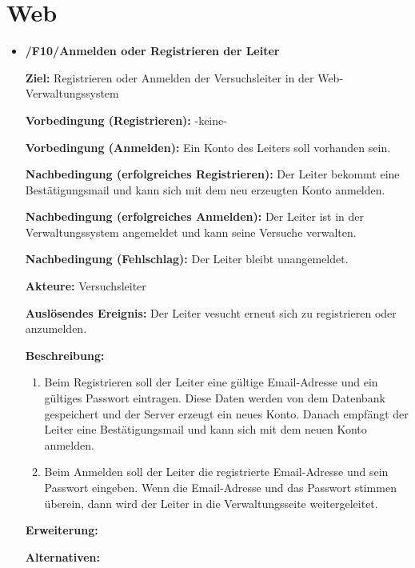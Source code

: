 \documentclass[a4paper]{scrreprt}
\begin{document}
		\section{Web}
	        \begin{itemize}
	            \item \textbf{/F10/Anmelden oder Registrieren der Leiter}
		          
	            	\par \textbf{Ziel: }Registrieren oder Anmelden der Versuchsleiter in der Web-Verwaltungssystem
	            	\par \textbf{Vorbedingung (Registrieren): }-keine-
	            	\par \textbf{Vorbedingung (Anmelden): }Ein Konto des Leiters soll vorhanden sein.
	            	\par \textbf{Nachbedingung (erfolgreiches Registrieren): }Der Leiter bekommt eine Bestätigungsmail und kann sich mit dem neu erzeugten Konto anmelden.
	            	\par \textbf{Nachbedingung (erfolgreiches Anmelden): }Der Leiter ist in der Verwaltungssystem angemeldet und kann seine Versuche verwalten.
	            	\par \textbf{Nachbedingung (Fehlschlag): }Der Leiter bleibt unangemeldet.
	            	\par \textbf{Akteure: }Versuchsleiter
	            	\par \textbf{Auslösendes Ereignis: }Der Leiter vesucht erneut sich zu registrieren oder anzumelden.
	            	\par \textbf{Beschreibung: }
		            	\begin{enumerate}
		            		\item Beim Registrieren soll der Leiter eine gültige Email-Adresse und ein gültiges Passwort eintragen. Diese Daten werden von dem Datenbank gespeichert und der Server erzeugt ein neues Konto. Danach empfängt der Leiter eine Bestätigungsmail und kann sich mit dem neuen Konto anmelden.
			            	\item Beim Anmelden soll der Leiter die registrierte Email-Adresse und sein Passwort eingeben. Wenn die Email-Adresse und das Passwort stimmen überein, dann wird der Leiter in die Verwaltungsseite weitergeleitet.
		            	\end{enumerate}
	            	\par \textbf{Erweiterung: }
	            	\par \textbf{Alternativen: }
	            	

\end{itemize}
\end{document}
